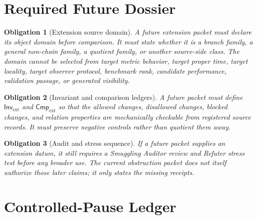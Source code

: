 \documentclass[11pt]{article}
\newcommand{\InvExt}{\mathsf{Inv}_{\mathrm{ext}}}
\newcommand{\CmpExt}{\mathsf{Cmp}_{\mathrm{ext}}}
\newtheorem{obligation}{Obligation}
\begin{document}
\section{Required Future Dossier}

\begin{obligation}[Extension source domain]
A future extension packet must declare its object domain before comparison.
It must state whether it is a branch family, a general non-chain family,
a quotient family, or another source-side class. The domain cannot be
selected from target metric behavior, target proper time, target locality,
target observer protocol, benchmark rank, candidate performance,
validation passage, or generated visibility.
\end{obligation}

\begin{obligation}[Invariant and comparison ledgers]
A future packet must define \(\InvExt\) and \(\CmpExt\) so that the
allowed changes, disallowed changes, blocked changes, and relation
properties are mechanically checkable from registered source records.
It must preserve negative controls rather than quotient them away.
\end{obligation}

\begin{obligation}[Audit and stress sequence]
If a future packet supplies an extension datum, it still requires a
Smuggling Auditor review and Refuter stress test before any broader use.
The current obstruction packet does not itself authorize those later
claims; it only states the missing receipts.
\end{obligation}

\section{Controlled-Pause Ledger}
\end{document}
